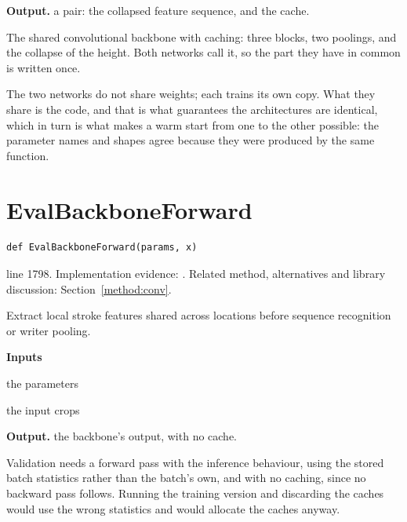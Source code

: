 \noindent\textbf{Output.} a pair: the collapsed feature sequence, and the cache.


The shared convolutional backbone with caching: three blocks, two poolings, and the collapse of the height. Both networks call it, so the part they have in common is written once.


The two networks do not share weights; each trains its own copy. What they share is the code, and that is what guarantees the architectures are identical, which in turn is what makes a warm start from one to the other possible: the parameter names and shapes agree because they were produced by the same function.



\section{EvalBackboneForward}\label{fn:train:EvalBackboneForward}
\begin{lstlisting}[style=sig]
def EvalBackboneForward(params, x)
\end{lstlisting}
 line 1798. Implementation evidence: \cite{code2026}. Related method, alternatives and library discussion: Section~\ref{method:conv}.


Extract local stroke features shared across locations before sequence recognition or writer pooling.




\noindent\textbf{Inputs}
\begin{description}[leftmargin=2.2em,style=nextline,font=\normalfont\ttfamily]\setlength\itemsep{1pt}
  \item[{params}] \normalfont the parameters
  \item[{x}] \normalfont the input crops
\end{description}

\noindent\textbf{Output.} the backbone's output, with no cache.


Validation needs a forward pass with the inference behaviour, using the stored batch statistics rather than the batch's own, and with no caching, since no backward pass follows. Running the training version and discarding the caches would use the wrong statistics and would allocate the caches anyway.



